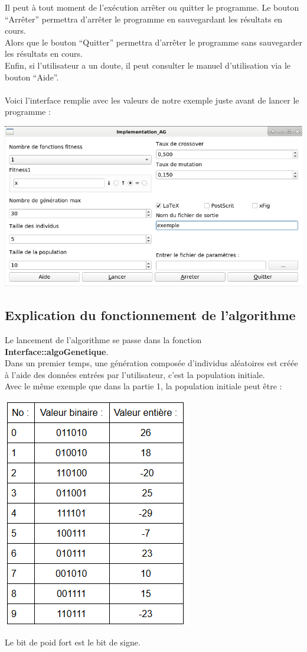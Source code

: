 \documentclass[a4paper,11pt]{article}
\begin{document}
			Il peut à tout moment de l'exécution arrêter ou quitter le programme. Le bouton “Arrêter” permettra d’arrêter le programme en sauvegardant les résultats en cours.\\
			Alors que le bouton “Quitter” permettra d’arrêter le programme sans sauvegarder les résultats en cours.\\
			Enfin, si l’utilisateur a un doute, il peut consulter le manuel d’utilisation via le bouton “Aide”.\\\\
			Voici l’interface remplie avec les valeurs de notre exemple juste avant de lancer le programme :\\
			\centerline{\includegraphics[scale=0.5]{Interface.png}}
			
		\subsection{Explication du fonctionnement de l’algorithme}
			Le lancement de l’algorithme se passe dans la fonction \textbf{Interface::algoGenetique}.\\
			Dans un premier temps, une génération composée d’individus aléatoires est créée à l’aide des données entrées par l’utilisateur, c’est la population initiale.\\
			Avec le même exemple que dans la partie 1, la population initiale peut être :\\
			\centerline{\includegraphics[scale=0.5]{ExemplePopulationInitiale.png}}
			Le bit de poid fort est le bit de signe.\\
			
\end{document}
